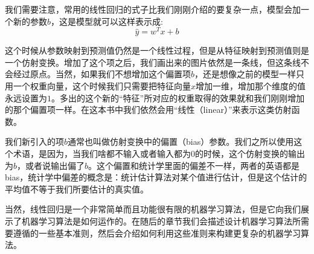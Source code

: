 我们需要注意，常用的线性回归的式子比我们刚刚介绍的要复杂一点，模型会加一个新的参数$b$，这是模型就可以这样表示成:
\begin{equation}
  \hat{y}=w^{T}x+b
\end{equation}

这个时候从参数映射到预测值仍然是一个线性过程，但是从特征映射到预测值则是一个仿射变换。增加了这个项之后，我们画出来的图片依然是一条线，但这条线不会经过原点。当然，如果我们不想增加这个偏置项$b$，还是想像之前的模型一样只用一个权重向量，这个时候我们只需要把特征向量$x$增加一维，增加那个维度的值永远设置为$1$。多出的这个新的“特征”所对应的权重取得的效果就和我们刚刚增加的那个偏置项一样。在这本书中我们依然会用“线性（linear）”来表示这类仿射函数。

我们新引入的项$b$通常也叫做仿射变换中的偏置（bias）参数。我们之所以使用这个术语，是因为，当我们啥都不输入或者输入都为$0$的时候，这个仿射变换的输出为$b$，或者说输出偏了$b$。这个偏置和统计学里面的偏差不一样，两者的英语都是bias，统计学中偏差的概念是：统计估计算法对某个值进行估计，但是这个估计的平均值不等于我们所要估计的真实值。

当然，线性回归是一个非常简单而且功能很有限的机器学习算法，但是它向我们展示了机器学习算法是如何运作的。在随后的章节我们会描述设计机器学习算法所需要遵循的一些基本准则，然后会介绍如何利用这些准则来构建更复杂的机器学习算法。

